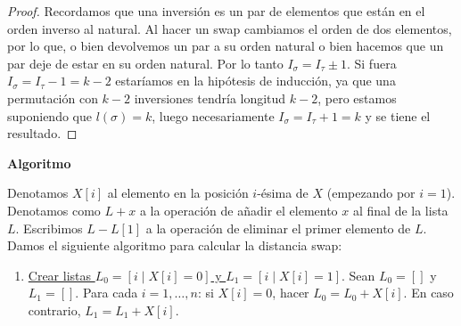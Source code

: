 \documentclass[twoside]{article}
\begin{document}
\begin{solucion}
\begin{proof}
Recordamos que una inversión es un par de elementos que están en el orden inverso al natural. Al hacer un swap cambiamos el orden de dos elementos, por lo que, o bien devolvemos un par a su orden natural o bien hacemos que un par deje de estar en su orden natural. Por lo tanto $I_{\sigma}=I_{\tau}\pm 1$. Si fuera $I_{\sigma}=I_{\tau}- 1=k-2$ estaríamos en la hipótesis de inducción, ya que una permutación con $k-2$ inversiones tendría longitud $k-2$, pero estamos suponiendo que $l(\sigma)=k$, luego necesariamente $I_{\sigma}=I_{\tau}+1=k$ y se tiene el resultado.
\end{proof}

\vspace{0.8cm}

\textbf{Algoritmo}

Denotamos $X[i]$ al elemento en la posición $i$-ésima de $X$ (empezando por $i=1$). Denotamos como $L+x$ a la operación de añadir el elemento $x$ al final de la lista $L$. Escribimos $L-L[1]$ a la operación de eliminar el primer elemento de $L$. Damos el siguiente algoritmo para calcular la distancia swap:

\begin{enumerate}

\item \underline{Crear listas $L_0=[i\mid X[i]=0]$ y $L_1=[i\mid X[i]=1]$}. Sean $L_0=[]$ y $L_1=[]$. Para cada $i=1,\dots, n$: si $X[i]=0$, hacer $L_0= L_0+X[i]$. En caso contrario, $L_1= L_1+X[i]$. 




\end{enumerate}
\end{solucion}
\end{document}
